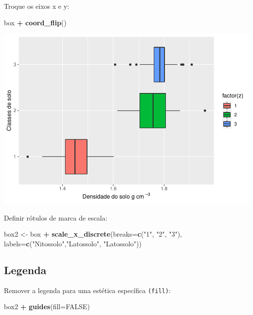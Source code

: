 \documentclass[
]{book}
\newenvironment{Shaded}{\begin{snugshade}}{\end{snugshade}}
\newcommand{\DataTypeTok}[1]{\textcolor[rgb]{0.13,0.29,0.53}{#1}}
\newcommand{\KeywordTok}[1]{\textcolor[rgb]{0.13,0.29,0.53}{\textbf{#1}}}
\newcommand{\NormalTok}[1]{#1}
\newcommand{\OperatorTok}[1]{\textcolor[rgb]{0.81,0.36,0.00}{\textbf{#1}}}
\newcommand{\OtherTok}[1]{\textcolor[rgb]{0.56,0.35,0.01}{#1}}
\newcommand{\StringTok}[1]{\textcolor[rgb]{0.31,0.60,0.02}{#1}}
\begin{document}
Troque os eixos x e y:

\begin{Shaded}
\begin{Highlighting}[]
\NormalTok{box }\OperatorTok{+}
\StringTok{  }\KeywordTok{coord_flip}\NormalTok{()}
\end{Highlighting}
\end{Shaded}

\includegraphics{TudodoR_files/figure-latex/unnamed-chunk-206-1.pdf}

Definir rótulos de marca de escala:

\begin{Shaded}
\begin{Highlighting}[]
\NormalTok{box2 <-}\StringTok{ }\NormalTok{box }\OperatorTok{+}
\StringTok{          }\KeywordTok{scale_x_discrete}\NormalTok{(}\DataTypeTok{breaks=}\KeywordTok{c}\NormalTok{(}\StringTok{"1"}\NormalTok{, }\StringTok{"2"}\NormalTok{, }\StringTok{"3"}\NormalTok{),}
            \DataTypeTok{labels=}\KeywordTok{c}\NormalTok{(}\StringTok{"Nitossolo"}\NormalTok{,}\StringTok{"Latossolo"}\NormalTok{, }\StringTok{"Latossolo"}\NormalTok{))}
\end{Highlighting}
\end{Shaded}

\hypertarget{legenda}{%
\subsection{Legenda}\label{legenda}}

Remover a legenda para uma estética específica \texttt{(fill)}:

\begin{Shaded}
\begin{Highlighting}[]
\NormalTok{box2 }\OperatorTok{+}\StringTok{ }\KeywordTok{guides}\NormalTok{(}\DataTypeTok{fill=}\OtherTok{FALSE}\NormalTok{)}
\end{Highlighting}
\end{Shaded}
\end{document}
